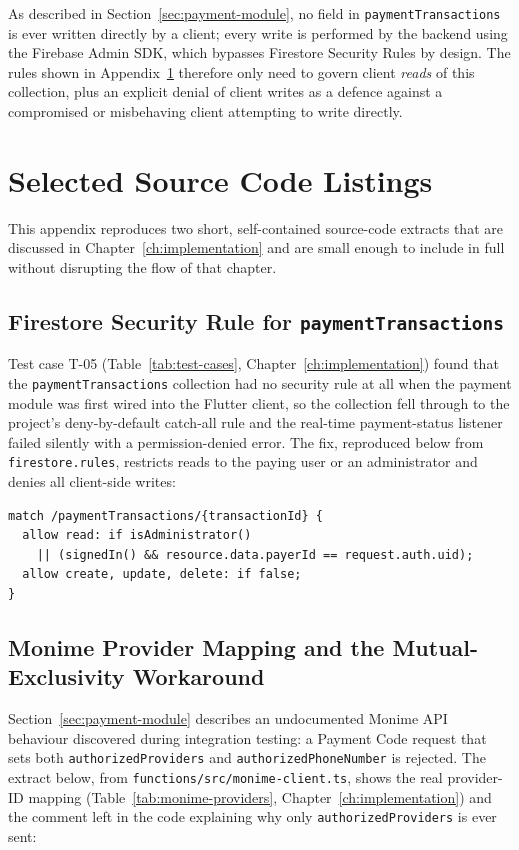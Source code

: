 As described in Section~\ref{sec:payment-module}, no field in
\texttt{paymentTransactions} is ever written directly by a client; every
write is performed by the backend using the Firebase Admin SDK, which
bypasses Firestore Security Rules by design. The rules shown in
Appendix~\ref{app:code} therefore only need to govern client \emph{reads}
of this collection, plus an explicit denial of client writes as a defence
against a compromised or misbehaving client attempting to write directly.

\chapter{Selected Source Code Listings}
\label{app:code}

This appendix reproduces two short, self-contained source-code extracts
that are discussed in Chapter~\ref{ch:implementation} and are small enough
to include in full without disrupting the flow of that chapter.

\section{Firestore Security Rule for \texttt{paymentTransactions}}

Test case T-05 (Table~\ref{tab:test-cases}, Chapter~\ref{ch:implementation})
found that the \texttt{paymentTransactions} collection had no security
rule at all when the payment module was first wired into the Flutter
client, so the collection fell through to the project's deny-by-default
catch-all rule and the real-time payment-status listener failed silently
with a permission-denied error. The fix, reproduced below from
\texttt{firestore.rules}, restricts reads to the paying user or an
administrator and denies all client-side writes:

\begin{verbatim}
match /paymentTransactions/{transactionId} {
  allow read: if isAdministrator()
    || (signedIn() && resource.data.payerId == request.auth.uid);
  allow create, update, delete: if false;
}
\end{verbatim}

\section{Monime Provider Mapping and the Mutual-Exclusivity Workaround}

Section~\ref{sec:payment-module} describes an undocumented Monime API
behaviour discovered during integration testing: a Payment Code request
that sets both \texttt{authorizedProviders} and
\texttt{authorizedPhoneNumber} is rejected. The extract below, from
\texttt{functions/src/monime-client.ts}, shows the real provider-ID mapping
(Table~\ref{tab:monime-providers}, Chapter~\ref{ch:implementation}) and the
comment left in the code explaining why only \texttt{authorizedProviders}
is ever sent:

